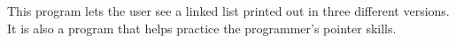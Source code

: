 This program lets the user see a linked list printed out in three different versions. It is also a program that helps practice the programmer's pointer skills. 
